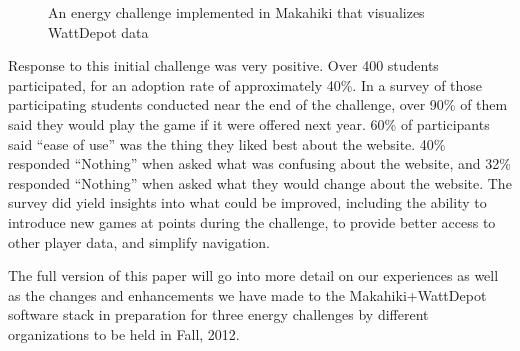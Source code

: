 \documentclass{acm_proc_article-sp}
\begin{document}
\begin{figure}
\begin{center}
\end{center}
\caption{An energy challenge implemented in Makahiki that visualizes WattDepot data}
\label{fig:golow}
\end{figure}

Response to this initial challenge was very positive.   Over 400 students participated,
for an adoption rate of approximately 40\%.  In a survey of those participating students
conducted near the end of the challenge, over 90\% of them said they would play the game
if it were offered next year.  60\% of participants said ``ease of use'' was the thing they
liked best about the website.  40\% responded ``Nothing'' when asked what was
confusing about the website, and 32\% responded ``Nothing'' when asked what they would
change about the website.  The survey did yield insights into what could be improved,
including the ability to introduce new games at points during the challenge, to provide
better access to other player data, and simplify navigation. 

The full version of this paper will go into more detail on our experiences as well as the
changes and enhancements we have made to the Makahiki+WattDepot software stack in
preparation for three energy challenges by different organizations to be held in Fall, 2012.



\end{document}
